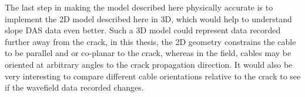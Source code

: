 The last step in making the model described here physically accurate is to implement the 2D model described here in 3D, which would help to understand slope DAS data even better. Such a 3D model could represent data recorded further away from the crack, in this thesis, the 2D geometry constrains the cable to be parallel and or co-planar to the crack, whereas in the field, cables may be oriented at arbitrary angles to the crack propagation direction. It would also be very interesting to compare different cable orientations relative to the crack to see if the wavefield data recorded changes. \par 

